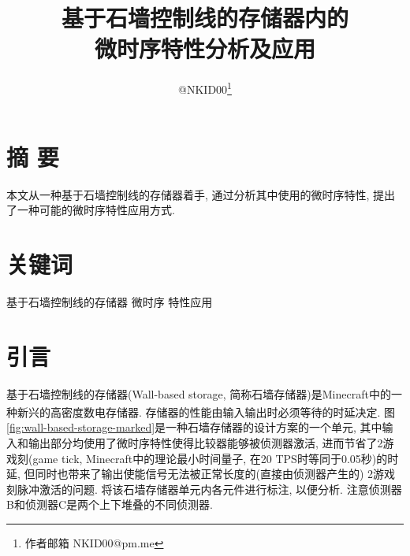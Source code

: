 \documentclass[UTF8,12pt,punct=kaiming,fontset=none]{ctexart}
\title{\vspace{-1.5cm}基于石墙控制线的存储器内的\\微时序特性分析及应用\vspace{-0.5cm}}
\author{@NKID00\footnote{作者邮箱 NKID00@pm.me}}
\date{}
\newcommand*{\upcite}[1]{
    \textsuperscript{\cite{#1}}
}
\begin{document}
\maketitle
\thispagestyle{fancy} %
\vspace{-0.7cm}

\begin{minipage}[c]{0.75\linewidth}
    \titleformat{\section}[wrap]{\sffamily\small\bfseries}{}{0cm}{}
    \titlespacing{\section}{2cm}{1ex}{0.4cm}
    
    \section{摘 \hspace{0.11cm} 要}
    \small 本文从一种基于石墙控制线的存储器着手, 通过分析其中使用的微时序特性, 提出了一种可能的微时序特性应用方式.
    
    \section{关键词}
    \small 基于石墙控制线的存储器 \hspace{0.5cm} 微时序 \hspace{0.5cm} 特性应用
\end{minipage}
\vspace{0.2cm}

\titleformat{\section}[hang]{\large\sffamily\bfseries}{\textmd{\thesection}}{0.5cm}{}
\titlespacing{\section}{0cm}{0.5ex}{0.2ex}
\setcounter{section}{-1}

\section{引言}
基于石墙控制线的存储器(Wall-based storage, 简称石墙存储器)是Minecraft中的一种新兴的高密度数电存储器.\upcite{bib:wall-based-storage} 存储器的性能由输入输出时必须等待的时延决定. 图\ref{fig:wall-based-storage-marked}是一种石墙存储器的设计方案的一个单元, 其中输入和输出部分均使用了微时序特性使得比较器能够被侦测器激活, 进而节省了2游戏刻(game tick, Minecraft中的理论最小时间量子, 在20 TPS时等同于0.05秒)的时延, 但同时也带来了输出使能信号无法被正常长度的(直接由侦测器产生的) 2游戏刻脉冲激活的问题. 将该石墙存储器单元内各元件进行标注, 以便分析. 注意侦测器B和侦测器C是两个上下堆叠的不同侦测器.
\end{document}
